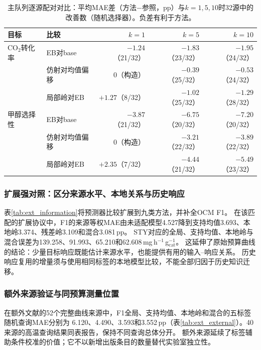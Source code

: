 \documentclass[11pt,a4paper]{article}
\newcommand{\pp}{\,pp}
\newcommand{\mgg}{\,mg\,h$^{-1}$\,g$_{\mathrm{cat}}^{-1}$}
\begin{document}
\begin{table}[t]
\centering\small
\caption{主队列逐源配对对比：平均MAE差（方法$-$参照，pp）与$k=1,5,10$时32源中的
改善数（随机选择器）。负差有利于方法。}
\label{tab:paired}
\begin{tabular}{llrrr}
\toprule
目标 & 比较 & $k=1$ & $k=5$ & $k=10$ \\
\midrule
CO$_2$转化率 & EB对base & $-1.24$（21/32） & $-1.83$（23/32） & $-1.95$（24/32） \\
 & 仿射对均值偏移 & 0（构造） & $-0.39$（25/32） & $-0.53$（24/32） \\
 & 局部岭对EB & $+1.27$（8/32） & $-1.02$（25/32） & $-1.29$（28/32） \\
\midrule
甲醇选择性 & EB对base & $-3.87$（21/32） & $-6.75$（20/32） & $-7.20$（20/32） \\
 & 仿射对均值偏移 & 0（构造） & $-3.21$（22/32） & $-3.89$（22/32） \\
 & 局部岭对EB & $+2.35$（7/32） & $-4.44$（21/32） & $-5.49$（23/32） \\
\bottomrule
\end{tabular}
\end{table}


\subsubsection{扩展强对照：区分来源水平、本地关系与历史响应}
表\ref{tab:ext_information}将预测器比较扩展到九类方法，并补全OCM F1。
在该匹配的扩展协议中，F1的来源等权MAE由未适配模型4.527降到支持均值3.693、本地岭3.374、残差岭3.109和混合3.081\pp{}。
STY对应的全局、支持均值、本地岭与混合误差为139.258、91.993、65.210和62.608\mgg{}。
这延伸了原始预算曲线的结论：少量目标响应既能估计来源水平，也能提供有用的输入--响应关系。
历史响应复用的增量须与使用相同标签的本地模型比较，不能全部归因于历史知识迁移。
\begin{table}[htbp]\centering\footnotesize
\setlength{\tabcolsep}{4pt}
\caption{扩展信息对照，五标签随机支持。每个面板内共享支持与查询。该表的冻结拟合和支持顺序独立于基础基准表\ref{tab:k5}；不跨表计算增益。STY保留原生单位，其余为百分点。}\label{tab:ext_information}

\end{table}

\subsubsection{额外来源验证与同预算测量位置}
在额外文献的52个完整曲线来源中，F1全局、支持均值、本地岭和混合的五标签随机查询MAE分别为
6.120、4.490、3.593和3.552\pp{}（表\ref{tab:ext_external}）。40来源的高温查询结果同表报告，保持不同查询总体分开。
额外来源延续了标签辅助条件校准的价值；它不以新增出版条目的数量替代实验室独立性。
\begin{table}[htbp]\centering\footnotesize
\setlength{\tabcolsep}{4pt}
\caption{额外文献来源上的五标签冻结应用。随机查询52源，高温查询40源；F0/F1为同一记录集的配对表征。MAE单位为百分点。}\label{tab:ext_external}

\end{table}
\end{document}
